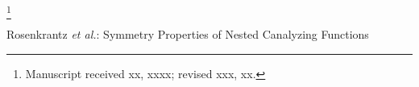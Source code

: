 \documentclass[10pt,journal,compsoc]{IEEEtran}
\begin{document}
\noindent
\thanks{Manuscript received xx, xxxx; revised xxx, xx.}

% 
%



%
{Rosenkrantz \MakeLowercase{\textit{et al.}}: Symmetry Properties of Nested 
Canalyzing Functions} 

% 


\end{document}
